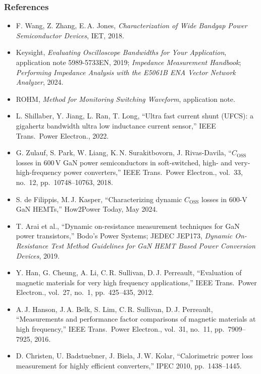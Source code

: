 \begin{frame}
	\frametitle{References}
	\scriptsize
	\begin{itemize}
		\item F. Wang, Z. Zhang, E.\,A. Jones, \textit{Characterization of Wide Bandgap Power Semiconductor Devices}, IET, 2018.
		\item Keysight, \textit{Evaluating Oscilloscope Bandwidths for Your Application}, application note 5989-5733EN, 2019; \textit{Impedance Measurement Handbook}; \textit{Performing Impedance Analysis with the E5061B ENA Vector Network Analyzer}, 2024.
		\item ROHM, \textit{Method for Monitoring Switching Waveform}, application note.
		\item L. Shillaber, Y. Jiang, L. Ran, T. Long, ``Ultra fast current shunt (UFCS): a gigahertz bandwidth ultra low inductance current sensor,'' IEEE Trans.\ Power Electron., 2022.
		\item G. Zulauf, S. Park, W. Liang, K.\,N. Surakitbovorn, J. Rivas-Davila, ``$C_\mathrm{OSS}$ losses in 600\,V GaN power semiconductors in soft-switched, high- and very-high-frequency power converters,'' IEEE Trans.\ Power Electron., vol.\ 33, no.\ 12, pp.\ 10748--10763, 2018.
		\item S. de Filippis, M.\,J. Kasper, ``Characterizing dynamic $C_\mathrm{OSS}$ losses in 600-V GaN HEMTs,'' How2Power Today, May 2024.
		\item T. Arai et al., ``Dynamic on-resistance measurement techniques for GaN power transistors,'' Bodo's Power Systems; JEDEC JEP173, \textit{Dynamic On-Resistance Test Method Guidelines for GaN HEMT Based Power Conversion Devices}, 2019.
		\item Y. Han, G. Cheung, A. Li, C.\,R. Sullivan, D.\,J. Perreault, ``Evaluation of magnetic materials for very high frequency applications,'' IEEE Trans.\ Power Electron., vol.\ 27, no.\ 1, pp.\ 425--435, 2012.
		\item A.\,J. Hanson, J.\,A. Belk, S. Lim, C.\,R. Sullivan, D.\,J. Perreault, ``Measurements and performance factor comparisons of magnetic materials at high frequency,'' IEEE Trans.\ Power Electron., vol.\ 31, no.\ 11, pp.\ 7909--7925, 2016.
		\item D. Christen, U. Badstuebner, J. Biela, J.\,W. Kolar, ``Calorimetric power loss measurement for highly efficient converters,'' IPEC 2010, pp.\ 1438--1445.
	\end{itemize}
\end{frame}
